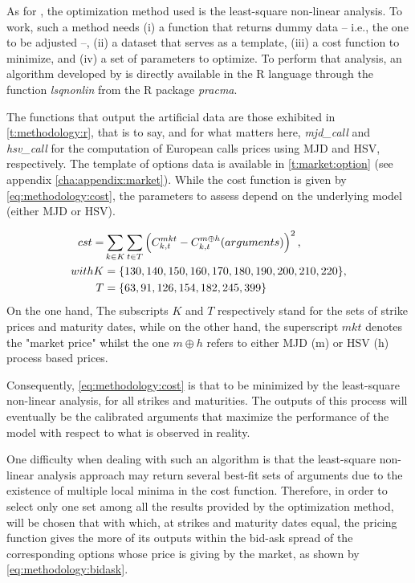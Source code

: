 \documentclass[12pt]{report}
\begin{document}
As for \citet{criso2015}, the optimization method used is the least-square non-linear analysis. 
To work, such a method needs (i) a function that returns dummy data -- i.e., the one to be adjusted --, (ii) a dataset that serves as a template, (iii) a cost function to minimize, and (iv) a set of parameters to optimize.
To perform that analysis, an algorithm developed by \citet{pracma} is directly available in the R language through the function \textit{lsqnonlin} from the R package \textit{pracma}.

The functions that output the artificial data are those exhibited in \cref{t:methodology:r}, that is to say, and for what matters here, \textit{mjd\_call} and \textit{hsv\_call} for the computation of European calls prices using MJD and HSV, respectively.
The template of  options data is available in \cref{t:market:option} (see appendix \ref{cha:appendix:market}).
While the cost function is given by \cref{eq:methodology:cost}, the parameters to assess depend on the underlying model (either MJD or HSV).

\begin{align}
 cst =& \sum_{k \in K} \sum_{t \in T} \left(C_{k,t}^{mkt} - C_{k,t}^{m \oplus h}(arguments)\right)^2
 \label{eq:methodology:cost}, \\
 with  K &=  \{130, 140, 150, 160, 170, 180, 190, 200, 210, 220\}, \notag\\
 T &= \left \{63, 91, 126, 154, 182, 245, 399\right \}\notag 
\end{align}
On the one hand, The subscripts $K$ and $T$ respectively stand for the sets of strike prices and maturity dates, while on the other hand, the superscript $mkt$ denotes the "market price" whilst the one $m \oplus h$ refers to either MJD (m) or HSV (h) process based prices.

Consequently, \cref{eq:methodology:cost} is that to be minimized by the least-square non-linear analysis, for all strikes and maturities.
The outputs of this process will eventually be the calibrated arguments that maximize the performance of the model with respect to what is observed in reality.

One difficulty when dealing with such an algorithm is that the least-square non-linear analysis approach may return several best-fit sets of arguments due to the existence of multiple local minima in the cost function.
Therefore, in order to select only one set among all the results provided by the optimization method, will be chosen that with which, at strikes and maturity dates equal, the pricing function gives the more of its outputs within the bid-ask spread of the corresponding options whose price is giving by the market, as shown by \cref{eq:methodology:bidask}.
\end{document}
